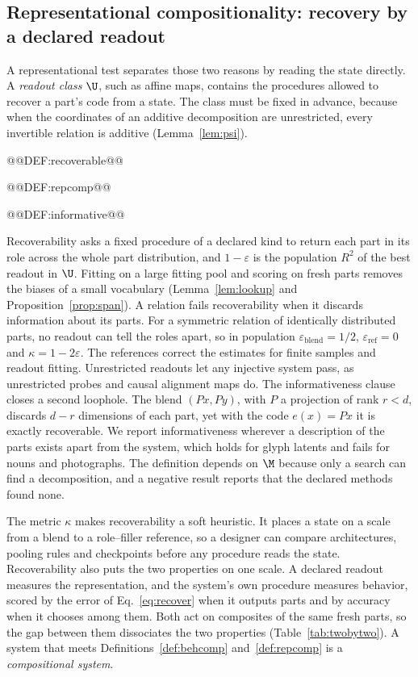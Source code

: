 \subsection{Representational compositionality: recovery by a declared readout}
\label{sec:repcomp}

A representational test separates those two reasons by reading the state directly. A \emph{readout class} $\U$, such as affine maps, contains the procedures allowed to recover a part's code from a state. The class must be fixed in advance, because when the coordinates of an additive decomposition are unrestricted, every invertible relation is additive (Lemma~\ref{lem:psi}).

@@DEF:recoverable@@

@@DEF:repcomp@@

@@DEF:informative@@

Recoverability asks a fixed procedure of a declared kind to return each part in its role across the whole part distribution, and $1 - \varepsilon$ is the population $R^2$ of the best readout in $\U$. Fitting on a large fitting pool and scoring on fresh parts removes the biases of a small vocabulary (Lemma~\ref{lem:lookup} and Proposition~\ref{prop:span}). A relation fails recoverability when it discards information about its parts. For a symmetric relation of identically distributed parts, no readout can tell the roles apart, so in population $\varepsilon_{\mathrm{blend}} = 1/2$, $\varepsilon_{\mathrm{ref}} = 0$ and $\kappa = 1 - 2\varepsilon$. The references correct the estimates for finite samples and readout fitting. Unrestricted readouts let any injective system pass, as unrestricted probes \citep{hewitt2019} and causal alignment maps \citep{sutter2025} do. The informativeness clause closes a second loophole. The blend $(Px, Py)$, with $P$ a projection of rank $r < d$, discards $d - r$ dimensions of each part, yet with the code $e(x) = Px$ it is exactly recoverable. We report informativeness wherever a description of the parts exists apart from the system, which holds for glyph latents and fails for nouns and photographs. The definition depends on $\M$ because only a search can find a decomposition, and a negative result reports that the declared methods found none.

The metric $\kappa$ makes recoverability a soft heuristic. It places a state on a scale from a blend to a role--filler reference, so a designer can compare architectures, pooling rules and checkpoints before any procedure reads the state. Recoverability also puts the two properties on one scale. A declared readout measures the representation, and the system's own procedure measures behavior, scored by the error of Eq.~\ref{eq:recover} when it outputs parts and by accuracy when it chooses among them. Both act on composites of the same fresh parts, so the gap between them dissociates the two properties (Table~\ref{tab:twobytwo}). A system that meets Definitions~\ref{def:behcomp} and~\ref{def:repcomp} is a \emph{compositional system}.

